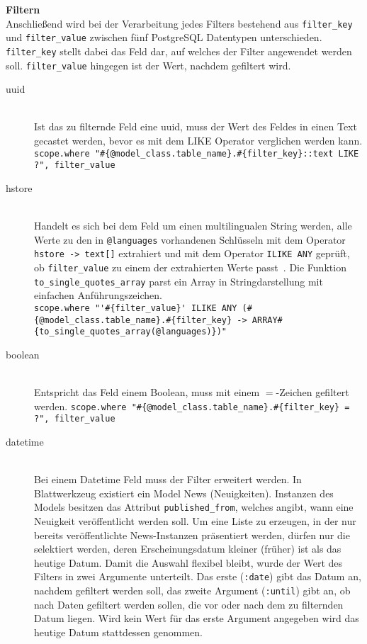 \textbf{Filtern} \ \\
Anschließend wird bei der Verarbeitung jedes Filters bestehend aus \texttt{filter\_key} und \texttt{filter\_value} zwischen fünf PostgreSQL Datentypen unterschieden.
\texttt{filter\_key} stellt dabei das Feld dar, auf welches der Filter angewendet werden soll. \texttt{filter\_value} hingegen ist der Wert, nachdem gefiltert wird.


\begin{description}
	\item[uuid] \ \\
		Ist das zu filternde Feld eine uuid, muss der Wert des Feldes in einen Text gecastet werden, bevor es mit dem LIKE Operator verglichen werden kann. \\
		\lstinline|scope.where "#{@model_class.table_name}.#{filter_key}::text LIKE ?", filter_value|
	\item[hstore] \ \\
		Handelt es sich bei dem Feld um einen multilingualen String werden, alle Werte zu den in \texttt{@languages} vorhandenen Schlüsseln mit dem Operator \texttt{hstore -> text[]} extrahiert und mit dem Operator \texttt{ILIKE ANY} geprüft, ob \texttt{filter\_value} zu einem der extrahierten Werte passt~\cite{ilike-any-postgres}.
		Die Funktion \texttt{to\-\_single\-\_quotes\-\_array} parst ein Array in Stringdarstellung mit einfachen Anführungszeichen.\\
		\lstinline|scope.where "'#{filter_value}' ILIKE ANY (#{@model_class.table_name}.#{filter_key} -> ARRAY#{to_single_quotes_array(@languages)})"|
	\item[boolean] \ \\
		Entspricht das Feld einem Boolean, muss mit einem $=$-Zeichen gefiltert werden.
		\lstinline|scope.where "#{@model_class.table_name}.#{filter_key} = ?", filter_value|
	\item[datetime] \ \\
		Bei einem Datetime Feld muss der Filter erweitert werden. In Blattwerkzeug existiert ein Model News (Neuigkeiten). Instanzen des Models besitzen das Attribut \texttt{published\_from}, welches angibt, wann eine Neuigkeit veröffentlicht werden soll. Um eine Liste zu erzeugen, in der nur bereits veröffentlichte News-Instanzen präsentiert werden, dürfen nur die selektiert werden, deren Erscheinungsdatum kleiner (früher) ist als das heutige Datum. Damit die Auswahl flexibel bleibt, wurde der Wert des Filters in zwei Argumente unterteilt. Das erste (\texttt{:date}) gibt das Datum an, nachdem gefiltert werden soll, das zweite Argument (\texttt{:until}) gibt an, ob nach Daten gefiltert werden sollen, die vor oder nach dem zu filternden Datum liegen. Wird kein Wert für das erste Argument angegeben wird das heutige Datum stattdessen genommen. \\

\end{description}
